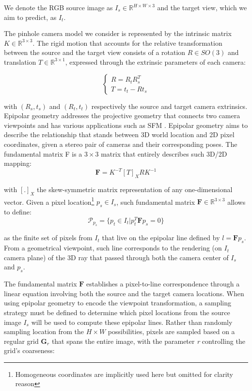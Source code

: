 We denote the RGB source image as $I_{s} \in \mathbb{R}^{H\times W\times 3}$ and the target view, which we aim to predict, as $I_{t}$.

The pinhole camera model we consider is represented by the intrinsic matrix $K \in \mathbb{R}^{3\times3}$. The rigid motion that accounts for the relative transformation between the source and the target view consists of a rotation $R \in SO(3)$ and translation $T\in \mathbb{R}^{3\times1}$, expressed through the extrinsic parameters of each camera:

\begin{equation}
     \begin{cases}
     R = R_{t} R_{s}^{T} \\
     T = t_{t} - R t_{s}
     \end{cases}
\end{equation}

with $(R_{s},t_{s})$ and $(R_{t},t_{t})$ respectively the source and target camera extrinsics. Epipolar geometry \citep{hartley2003multiple} addresses the projective geometry that connects two camera viewpoints and has various applications such as \ac{SFM} \citep{tamaazousti2011nonlinear}. Epipolar geometry aims to describe the relationship that stands between 3D world location and 2D pixel coordinates, given a stereo pair of cameras and their corresponding poses. The fundamental matrix F is a $3\times3$ matrix that entirely describes such 3D/2D mapping: 
\begin{equation}
    \mathbf{F} = K^{-T} [T]_{X} R  K^{-1}
\end{equation}

with $[.]_{X}$ the skew-symmetric matrix representation of any one-dimensional vector. Given a pixel location\footnote{Homogeneous coordinates are implicitly used here but omitted for clarity reason} $p_{s}\in I_{s}$, such fundamental matrix $\mathbf{F} \in \mathbb{R}^{3\times3}$ allows to define: 
\begin{equation}
    \mathcal{P}_{p_{s}} = \{p_{t}\in I_{t} | p_{t}^{T}\mathbf{F}p_{s} = 0 \}
\end{equation}

as the finite set of pixels from $I_{t}$ that live on the epipolar line defined by $l=\mathbf{F}p_{s}$. From a geometrical viewpoint, such line corresponds to the rendering (on $I_{t}$ camera plane) of the 3D ray that passed through both the camera center of $I_{s}$ and $p_{s}$. 

The fundamental matrix $\mathbf{F}$ establishes a pixel-to-line correspondence through a linear equation involving both the source and the target camera locations. When using epipolar geometry to encode the viewpoint transformation, a sampling strategy must be defined to determine which pixel locations from the source image $I_{s}$ will be used to compute these epipolar lines. Rather than randomly sampling location from the $H\times W$ possibilities, pixels are sampled based on a regular grid $\textbf{G}_{r}$ that spans the entire image, with the parameter \textit{r} controlling the grid’s coarseness: 

